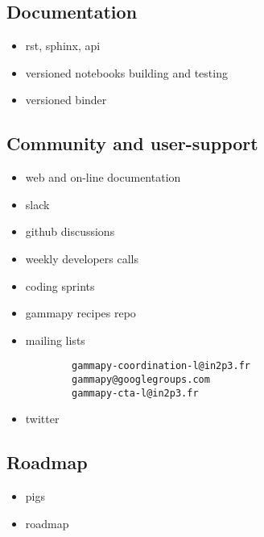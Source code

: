 \subsection{Documentation}
\label{ssec:documentation}

\begin{itemize}
	\item rst, sphinx, api
	\item versioned notebooks building and testing
	\item versioned binder
\end{itemize}

\subsection{Community and user-support}
\label{ssec:community-and-user-support}

\begin{itemize}
	\item web and on-line documentation 	
	\item slack
	\item github discussions
	\item weekly developers calls
	\item coding sprints 
	\item gammapy recipes repo
	\item mailing lists 
		\begin{verbatim}
		gammapy-coordination-l@in2p3.fr 
		gammapy@googlegroups.com 
		gammapy-cta-l@in2p3.fr
		\end{verbatim}
	\item twitter
\end{itemize}

\subsection{Roadmap}
\label{ssec:roadmap}

\begin{itemize}
	\item pigs
	\item roadmap
\end{itemize}
